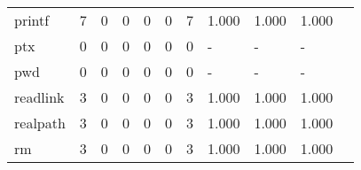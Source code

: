 \begin{longtable}{lp{1.2cm}p{1.2cm}p{1.2cm}p{1.2cm}p{1.2cm}p{1.2cm}p{1.2cm}p{1.2cm}p{1.2cm}p{1.2cm}}
printf    &                                     7 &                                                  0 &                                                  0 &                                                  0 &                                                  0 &                                                  7 &                                              1.000 &                                              1.000 &                                              1.000 \\
ptx       &                                     0 &                                                  0 &                                                  0 &                                                  0 &                                                  0 &                                                  0 &                                                  - &                                                  - &                                                  - \\
pwd       &                                     0 &                                                  0 &                                                  0 &                                                  0 &                                                  0 &                                                  0 &                                                  - &                                                  - &                                                  - \\
readlink  &                                     3 &                                                  0 &                                                  0 &                                                  0 &                                                  0 &                                                  3 &                                              1.000 &                                              1.000 &                                              1.000 \\
realpath  &                                     3 &                                                  0 &                                                  0 &                                                  0 &                                                  0 &                                                  3 &                                              1.000 &                                              1.000 &                                              1.000 \\
rm        &                                     3 &                                                  0 &                                                  0 &                                                  0 &                                                  0 &                                                  3 &                                              1.000 &                                              1.000 &                                              1.000 \\

\end{longtable}
